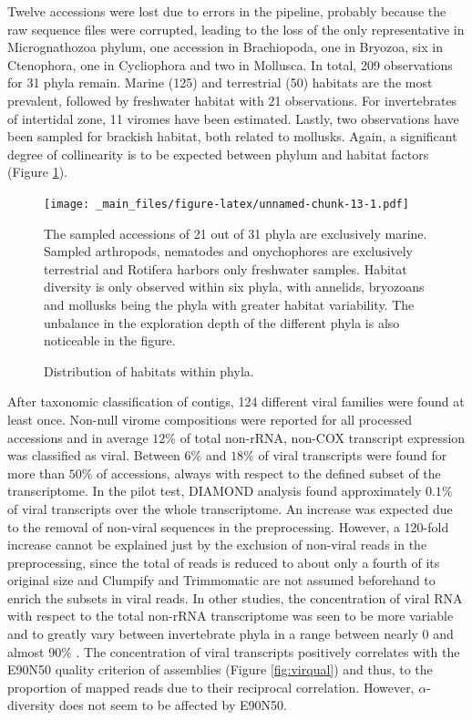 \documentclass[
  openany]{book}
\begin{document}
Twelve accessions were lost due to errors in the pipeline, probably because the raw sequence files were corrupted, leading to the loss of the only representative in Micrognathozoa phylum, one accession in Brachiopoda, one in Bryozoa, six in Ctenophora, one in Cycliophora and two in Mollusca. In total, 209 observations for 31 phyla remain. Marine (125) and terrestrial (50) habitats are the most prevalent, followed by freshwater habitat with 21 observations. For invertebrates of intertidal zone, 11 viromes have been estimated. Lastly, two observations have been sampled for brackish habitat, both related to mollusks. Again, a significant degree of collinearity is to be expected between phylum and habitat factors (Figure \ref{fig:habitatdivdef}).

\begin{figure}[!htbp]

\texttt{[image: \_main\_files/figure-latex/unnamed-chunk-13-1.pdf]}

\caption{Distribution of habitats within phyla.\label{fig:habitatdivdef}}
The sampled accessions of 21 out of 31 phyla are exclusively marine. Sampled arthropods, nematodes and onychophores are exclusively terrestrial and Rotifera harbors only freshwater samples. Habitat diversity is only observed within six phyla, with annelids, bryozoans and mollusks being the phyla with greater habitat variability. The unbalance in the exploration depth of the different phyla is also noticeable in the figure.


\end{figure}

After taxonomic classification of contigs, 124 different viral families were found at least once. Non-null virome compositions were reported for all processed accessions and in average \(12\%\) of total non-rRNA, non-COX transcript expression was classified as viral. Between \(6\%\) and \(18\%\) of viral transcripts were found for more than \(50\%\) of accessions, always with respect to the defined subset of the transcriptome. In the pilot test, DIAMOND analysis found approximately \(0.1\%\) of viral transcripts over the whole transcriptome. An increase was expected due to the removal of non-viral sequences in the preprocessing. However, a 120-fold increase cannot be explained just by the exclusion of non-viral reads in the preprocessing, since the total of reads is reduced to about only a fourth of its original size and Clumpify and Trimmomatic are not assumed beforehand to enrich the subsets in viral reads. In other studies, the concentration of viral RNA with respect to the total non-rRNA transcriptome was seen to be more variable and to greatly vary between invertebrate phyla in a range between nearly 0 and almost \(90\%\) \autocite{Shi2016}. The concentration of viral transcripts positively correlates with the E90N50 quality criterion of assemblies (Figure \ref{fig:virqual}) and thus, to the proportion of mapped reads due to their reciprocal correlation. However, \(\alpha\)-diversity does not seem to be affected by E90N50.
\end{document}
